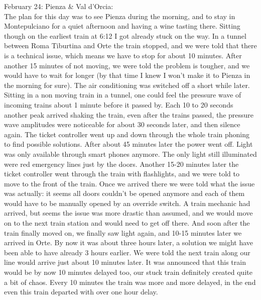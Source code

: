 February 24: Pienza \& Val d'Orcia:\\%
The plan for this day was to see Pienza during the morning, and to stay in Montepulciano for a quiet afternoon and having a wine tasting there. Sitting though on the earliest train at 6:12 I got already stuck on the way. In a tunnel between Roma Tiburtina and Orte the train stopped, and we were told that there is a technical issue, which means we have to stop for about 10 minutes. After another 15 minutes of not moving, we were told the problem is tougher, and we would have to wait for longer (by that time I knew I won't make it to Pienza in the morning for sure). The air conditioning was switched off a short while later. Sitting in a non moving train in a tunnel, one could feel the pressure wave of incoming trains about 1 minute before it passed by. Each 10 to 20 seconds another peak arrived shaking the train, even after the trains passed, the pressure wave amplitudes were noticeable for about 30 seconds later, and then silence again. The ticket controller went up and down through the whole train phoning to find possible solutions. After about 45 minutes later the power went off. Light was only available through smart phones anymore. The only light still illuminated were red emergency lines just by the doors. Another 15-20 minutes later the ticket controller went through the train with flashlights, and we were told to move to the front of the train. Once we arrived there we were told what the issue was actually: it seems all doors couldn't be opened anymore and each of them would have to be manually opened by an override switch. A train mechanic had arrived, but seems the issue was more drastic than assumed, and we would move on to the next train station and would need to get off there. And soon after the train finally moved on, we finally saw light again, and 10-15 minutes later we arrived in Orte. By now it was about three hours later, a solution we might have been able to have already 3 hours earlier. We were told the next train along our line would arrive just about 10 minutes later. It was announced that this train would be by now 10 minutes delayed too, our stuck train definitely created quite a bit of chaos. Every 10 minutes the train was more and more delayed, in the end even this train departed with over one hour delay.\\

